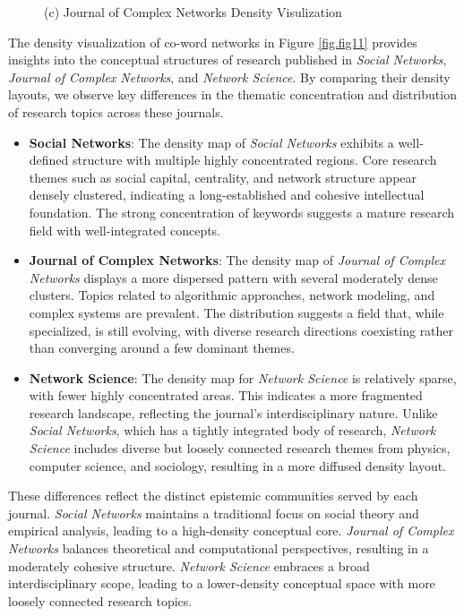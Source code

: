 \documentclass[twocolumn]{article}
\begin{document}
\begin{figure}
\begin{minipage}[b]{0.32\textwidth}
				(c) Journal of Complex Networks Density Visulization
			\end{minipage}
		\end{figure}
		
		The density visualization of co-word networks in Figure \ref{fig.fig11} provides insights into the conceptual structures of research published in \textit{Social Networks}, \textit{Journal of Complex Networks}, and \textit{Network Science}. By comparing their density layouts, we observe key differences in the thematic concentration and distribution of research topics across these journals.
		
		\begin{itemize}
			\item \textbf{Social Networks}: The density map of \textit{Social Networks} exhibits a well-defined structure with multiple highly concentrated regions. Core research themes such as social capital, centrality, and network structure appear densely clustered, indicating a long-established and cohesive intellectual foundation. The strong concentration of keywords suggests a mature research field with well-integrated concepts.
			
			\item \textbf{Journal of Complex Networks}: The density map of \textit{Journal of Complex Networks} displays a more dispersed pattern with several moderately dense clusters. Topics related to algorithmic approaches, network modeling, and complex systems are prevalent. The distribution suggests a field that, while specialized, is still evolving, with diverse research directions coexisting rather than converging around a few dominant themes.
			
			\item \textbf{Network Science}: The density map for \textit{Network Science} is relatively sparse, with fewer highly concentrated areas. This indicates a more fragmented research landscape, reflecting the journal’s interdisciplinary nature. Unlike \textit{Social Networks}, which has a tightly integrated body of research, \textit{Network Science} includes diverse but loosely connected research themes from physics, computer science, and sociology, resulting in a more diffused density layout.
		\end{itemize}
		
		These differences reflect the distinct epistemic communities served by each journal. \textit{Social Networks} maintains a traditional focus on social theory and empirical analysis, leading to a high-density conceptual core. \textit{Journal of Complex Networks} balances theoretical and computational perspectives, resulting in a moderately cohesive structure. \textit{Network Science} embraces a broad interdisciplinary scope, leading to a lower-density conceptual space with more loosely connected research topics.
		
\end{document}
